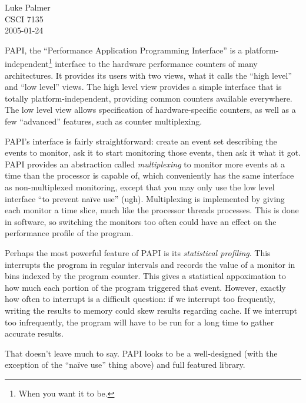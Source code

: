 \documentclass[12pt]{article}
\begin{document}
\noindent 
Luke Palmer \\
CSCI 7135 \\
2005-01-24

PAPI, the ``Performance Application Programming Interface'' is a
platform-independent\footnote{When you want it to be.} interface to the
hardware performance counters of many architectures.  It provides its
users with two views, what it calls the ``high level'' and ``low level''
views.   The high level view provides a simple interface that is totally
platform-independent, providing common counters available everywhere.
The low level view allows specification of hardware-specific counters,
as well as a few ``advanced'' features, such as counter multiplexing.

PAPI's interface is fairly straightforward: create an event set
describing the events to monitor, ask it to start monitoring those
events, then ask it what it got.  PAPI provides an abstraction called
\textit{multiplexing} to monitor more events at a time than the
processor is capable of, which conveniently has the same interface as
non-multiplexed monitoring, except that you may only use the low level
interface ``to prevent na\"ive use'' (ugh).  Multiplexing is implemented
by giving each monitor a time slice, much like the processor threads
processes.  This is done in software, so switching the monitors too
often could have an effect on the performance profile of the program.

Perhaps the most powerful feature of PAPI is its \textit{statistical
profiling}.  This interrupts the program in regular intervals and
records the value of a monitor in bins indexed by the program counter.
This gives a statistical appoximation to how much each portion of the
program triggered that event.  However, exactly how often to interrupt
is a difficult question: if we interrupt too frequently, writing the
results to memory could skew results regarding cache.  If we interrupt
too infrequently, the program will have to be run for a long time to
gather accurate results.

That doesn't leave much to say.  PAPI looks to be a well-designed
(with the exception of the ``na\"ive use'' thing above) and full
featured library.
\end{document}
